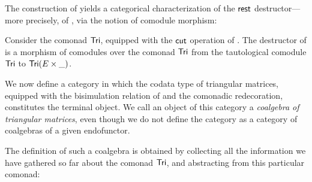 \documentclass{amsart}
\begin{document}
The construction of  yields a categorical characterization of the $\mathsf{rest}$ destructor---%
more precisely, of , via the notion of comodule morphism:


\begin{example}\label{ex:tail_comodule}
 Consider the comonad $\mathsf{Tri}$, equipped with the $\mathsf{cut}$ operation of .
 The destructor \constfont{\tail} of  is a morphism of comodules over the comonad $\mathsf{Tri}$ 
  from the tautological comodule  $\mathsf{Tri}$ to $\mathsf{Tri}(E\times \_)$.
\end{example}








We now define a category in which the codata type of triangular matrices, equipped with the bisimulation relation of 
and the comonadic redecoration, constitutes the terminal object. We call an object of this category a \emph{coalgebra of triangular matrices}, 
even though we do not define the category as a category of coalgebras of a given endofunctor.

The definition of such a coalgebra is obtained by collecting all the information we have gathered so
far about the comonad $\mathsf{Tri}$, and abstracting from this particular comonad:
\end{document}
